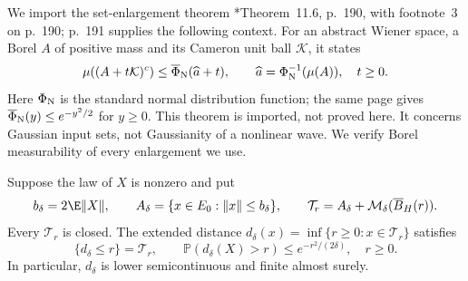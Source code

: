 We import the set-enlargement theorem
\cite{friz.hairer:20:course}*{Theorem~11.6, p.~190},
with footnote~3 on p.~190; p.~191 supplies the following context.
For an abstract Wiener space, a Borel $A$ of positive mass and
its Cameron unit ball $\mathcal K$, it states
\[
  \mu((A+t\mathcal K)^c)
  \le\overline\Phi_{\rm N}(\widehat a+t),\qquad
  \widehat a=\Phi_{\rm N}^{-1}(\mu(A)),\quad t\ge0 .
\]
Here $\Phi_{\rm N}$ is the standard normal distribution function;
the same page gives $\overline\Phi_{\rm N}(y)\le e^{-y^2/2}$
for $y\ge0$. This theorem is imported, not proved here.
It concerns Gaussian input sets, not Gaussianity of a nonlinear wave.
We verify Borel measurability of every enlargement we use.

\begin{lemma}
  \label{L:tube-closed-geometry}
  Suppose the law of $X$ is nonzero and put
  \[
    b_\delta=2\E\|X\|,\qquad
    A_\delta=\{x\in E_0:\|x\|\le b_\delta\},\qquad
    \mathcal T_r=A_\delta+\mathcal M_\delta(\overline B_H(r)).
  \]
  Every $\mathcal T_r$ is closed.
  The extended distance
  $d_\delta(x)=\inf\{r\ge0:x\in\mathcal T_r\}$ satisfies
  \begin{equation}\label{E:tube-attained-radius}
    \{d_\delta\le r\}=\mathcal T_r,\qquad
    \mathbb P(d_\delta(X)>r)\le e^{-r^2/(2\delta)},\quad r\ge0 .
  \end{equation}
  In particular, $d_\delta$ is lower semicontinuous and finite almost surely.
\end{lemma}

